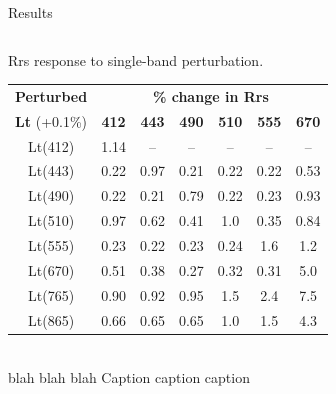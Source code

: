 \documentclass[final]{beamer}
\newlength{\onecolwid}
\newlength{\twocolwid}
\begin{document}
\begin{frame}[t]
\begin{columns}[t]
\begin{column}{\twocolwid}
\begin{block}{Results}
\begin{columns}[t,totalwidth=\twocolwid]
\begin{column}{\onecolwid}
\begin{table}
\centering
\vspace{2ex}
Rrs response to single-band perturbation. 
\begin{tabular}{|*{7}{c|}}
\toprule
\textbf{Perturbed} & \multicolumn{6}{|c|}{\textbf{\% change in Rrs}}\\
\cline{2-7}
\textbf{Lt} (+0.1\%) & \textbf{412} & \textbf{443} & \textbf{490} & \textbf{510} & \textbf{555} & \textbf{670}\\
\midrule
Lt(412) &  1.14 & -- & -- & -- & -- & --\\  
Lt(443) & 0.22 & 0.97 & 0.21 & 0.22 & 0.22 &  0.53\\
Lt(490) & 0.22 & 0.21 & 0.79 & 0.22 & 0.23 &  0.93\\
Lt(510) & 0.97 & 0.62 & 0.41 &  1.0 & 0.35 & 0.84\\
Lt(555) & 0.23 & 0.22 & 0.23 & 0.24 & 1.6 & 1.2\\
Lt(670) & 0.51 & 0.38 & 0.27 & 0.32 & 0.31 &  5.0\\
Lt(765) & 0.90 & 0.92 & 0.95 &  1.5 &  2.4 &  7.5\\
Lt(865) & 0.66 & 0.65 & 0.65 &  1.0 &  1.5 &  4.3\\
\bottomrule
\end{tabular}
\\{blah blah blah Caption caption caption}
\end{table}



\end{column}
\end{columns}
\end{block}
\end{column}
\end{columns}
\end{frame}
\end{document}
